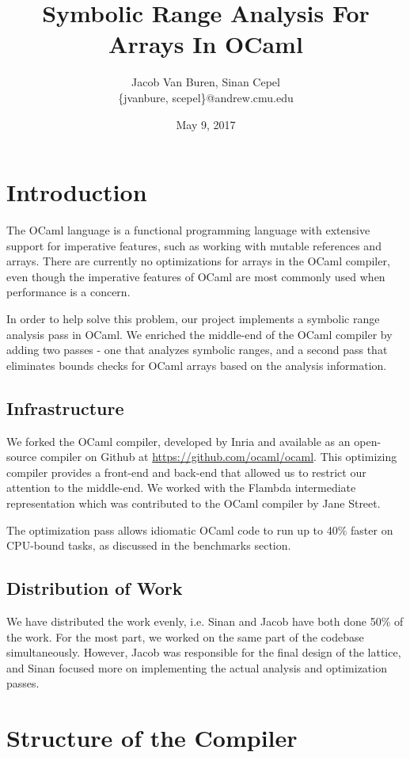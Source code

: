 \documentclass[11pt]{article}
\title{Symbolic Range Analysis For Arrays In OCaml}
\date{May 9, 2017}
\author{Jacob Van Buren, Sinan Cepel \\ \{jvanbure, scepel\}@andrew.cmu.edu}
\begin{document}
\maketitle

\section{Introduction}

The OCaml language is a functional programming language with extensive support for imperative features, such as working with mutable references and arrays. There are currently no optimizations for arrays in the OCaml compiler, even though the imperative features of OCaml are most commonly used when performance is a concern.

In order to help solve this problem, our project implements a symbolic range analysis pass in OCaml. We enriched the middle-end of the OCaml compiler by adding two passes - one that analyzes symbolic ranges, and a second pass that eliminates bounds checks for OCaml arrays based on the analysis information.


\subsection{Infrastructure}

We forked the OCaml compiler, developed by Inria and available as an open-source compiler on Github at \url{https://github.com/ocaml/ocaml}. This optimizing compiler provides a front-end and back-end that allowed us to restrict our attention to the middle-end. We worked with the Flambda intermediate representation which was contributed to the OCaml compiler by Jane Street.

The optimization pass allows idiomatic OCaml code to run up to 40\% faster on CPU-bound tasks, as discussed in the benchmarks section. 

\subsection{Distribution of Work}

We have distributed the work evenly, i.e. Sinan and Jacob have both done 50\% of the work. For the most part, we worked on the same part of the codebase simultaneously. However, Jacob was responsible for the final design of the lattice, and Sinan focused more on implementing the actual analysis and optimization passes.

\section{Structure of the Compiler}
\end{document}

